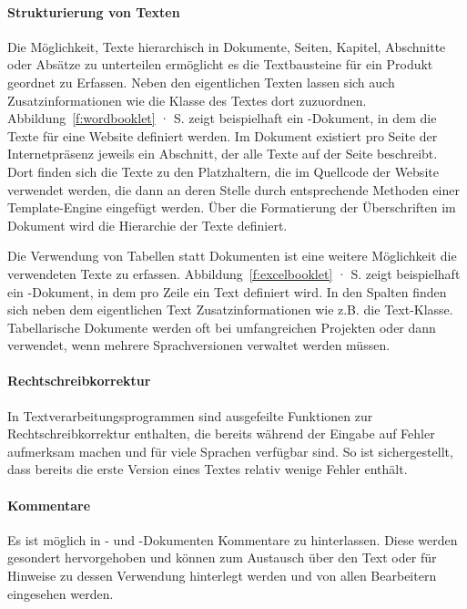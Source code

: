 \paragraph{Strukturierung von Texten} Die Möglichkeit, Texte hierarchisch in Dokumente, Seiten, Kapitel, Abschnitte oder Absätze zu unterteilen ermöglicht es die Textbausteine für ein Produkt geordnet zu Erfassen. Neben den eigentlichen Texten lassen sich auch Zusatzinformationen wie die Klasse des Textes dort zuzuordnen. Abbildung~\ref{f:wordbooklet} · S.\pageref{f:wordbooklet} zeigt beispielhaft ein -Dokument, in dem die Texte für eine Website definiert werden. Im Dokument existiert pro Seite der Internetpräsenz jeweils ein Abschnitt, der alle Texte auf der Seite beschreibt. Dort finden sich die Texte zu den Platzhaltern, die im Quellcode der Website verwendet werden, die dann an deren Stelle durch entsprechende Methoden einer Template-Engine eingefügt werden. Über die Formatierung der Überschriften im Dokument wird die Hierarchie der Texte definiert. 

Die Verwendung von Tabellen statt Dokumenten ist eine weitere Möglichkeit die verwendeten Texte zu erfassen. Abbildung~\ref{f:excelbooklet} · S.\pageref{f:excelbooklet} zeigt beispielhaft ein -Dokument, in dem pro Zeile ein Text definiert wird. In den Spalten finden sich neben dem eigentlichen Text Zusatzinformationen wie z.B. die Text-Klasse. Tabellarische Dokumente werden oft bei umfangreichen Projekten oder dann verwendet, wenn mehrere Sprachversionen verwaltet werden müssen.

\paragraph{Rechtschreibkorrektur} In Textverarbeitungsprogrammen sind ausgefeilte Funktionen zur Rechtschreibkorrektur enthalten, die bereits während der Eingabe auf Fehler aufmerksam machen und für viele Sprachen verfügbar sind. So ist sichergestellt, dass bereits die erste Version eines Textes relativ wenige Fehler enthält.

\paragraph{Kommentare} Es ist möglich in - und -Dokumenten Kommentare zu hinterlassen. Diese werden gesondert hervorgehoben und können zum Austausch über den Text oder für Hinweise zu dessen Verwendung hinterlegt werden und von allen Bearbeitern eingesehen werden.

